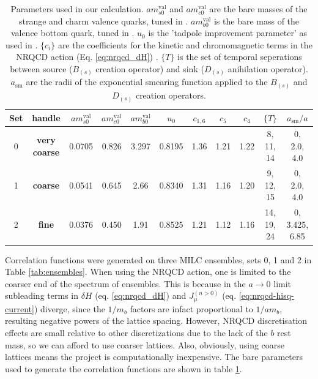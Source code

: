 \begin{table}[t!]
\hspace{-40pt}
 \begin{tabular}{c c c c c c c c c c c}
 \hline
 Set & handle & $am^{\text{val}}_{s0}$ & $am^{\text{val}}_{c0}$ & $am^{\text{val}}_{b0}$ & $u_0$ & $c_{1,6}$ & $c_5$ & $c_4$ & $\{T\}$ & $a_{\text{sm}}/a$ \\ [0.5ex] 
 \hline
 0 & {\textbf{very coarse}} & 0.0705 & 0.826 & 3.297 & 0.8195 & 1.36 & 1.21 & 1.22 & 8, 11, 14 & 0, 2.0, 4.0 \\ [1ex]
 1 & {\textbf{coarse}} & 0.0541 & 0.645 & 2.66 & 0.8340 & 1.31 & 1.16 & 1.20 & 9, 12, 15 & 0, 2.0, 4.0 \\ [1ex]
 2 & {\textbf{fine}} & 0.0376 & 0.450 & 1.91 & 0.8525 &  1.21 & 1.12 & 1.16 & 14, 19, 24 & 0, 3.425, 6.85 \\ [1ex]
 \hline
\end{tabular}
 \caption{Parameters used in our calculation. $am^{\text{val}}_{s0}$ and $am^{\text{val}}_{c0}$ are the bare masses of the strange and charm valence quarks, tuned in \cite{PhysRevD.91.054508}. $am^{\text{val}}_{b0}$ is the bare mass of the valence bottom quark, tuned in \cite{Dowdall:2011wh}. $u_0$ is the 'tadpole improvement parameter' as used in \cite{Dowdall:2011wh}. $\{c_i\}$ are the coefficients for the kinetic and chromomagnetic terms in the NRQCD action (Eq. \eqref{eq:nrqcd_dH}) \cite{Hammant:2013sca}. $\{T\}$ is the set of temporal seperations between source ($B_{(s)}$ creation operator) and sink ($D_{(s)}$ anihilation operator). $a_{\text{sm}}$ are the radii of the exponential smearing function applied to the $B_{(s)}$ and $D_{(s)}$ creation operators.
   \label{tab:quarkmasses}}
\end{table}

Correlation functions were generated on three MILC ensembles, sets 0, 1 and 2 in Table \ref{tab:ensembles}. When using the NRQCD action, one is limited to the coarser end of the spectrum of ensembles. This is because in the $a\to 0$ limit subleading terms in $\delta H$ (eq. \eqref{eq:nrqcd_dH}) and $J^{(n>0)}_{\mu}$ (eq. \eqref{eq:nrqcd-hisq-current}) diverge, since the $1/m_b$ factors are infact proportional to $1/am_b$, resulting negative powers of the lattice spacing. However, NRQCD discretisation effects are small relative to other discretizations due to the lack of the $b$ rest mass, so we can afford to use coarser lattices. Also, obviously, using coarse lattices means the project is computationally inexpensive. The bare parameters used to generate the correlation functions are shown in table \ref{tab:quarkmasses}.

